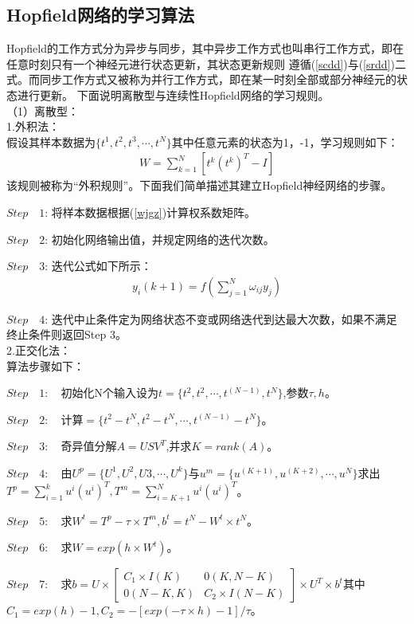 \subsection{Hopfield网络的学习算法}
Hopfield的工作方式分为异步与同步，其中异步工作方式也叫串行工作方式，即在任意时刻只有一个神经元进行状态更新，其状态更新规则
遵循(\ref{scdd})与(\ref{srdd})二式。而同步工作方式又被称为并行工作方式，即在某一时刻全部或部分神经元的状态进行更新。
下面说明离散型与连续性Hopfield网络的学习规则。\\
（1）离散型：\\
1.外积法：\\
假设其样本数据为$\{t^1,t^2,t^3,\cdots, t^N\}$其中任意元素的状态为1，-1，学习规则如下：
\begin{align}
    W = \sum_{k=1}^N [t^k(t^k)^T-I] \label{wjgz} %
\end{align}
该规则被称为“外积规则”。下面我们简单描述其建立Hopfield神经网络的步骤。\\
\par
$Step \quad 1$: 将样本数据根据(\ref{wjgz})计算权系数矩阵。
\par
$Step \quad 2$: 初始化网络输出值，并规定网络的迭代次数。
\par
$Step \quad 3$: 迭代公式如下所示：
\begin{align}
    y_i(k+1) = f(\sum_{j=1}^N \omega_{ij} y_j)
\end{align}
\par
$Step \quad 4$: 迭代中止条件定为网络状态不变或网络迭代到达最大次数，如果不满足终止条件则返回Step 3。\\
2.正交化法：\\
算法步骤如下：\\
\par
$Step \quad 1: \quad $初始化N个输入设为$t = \{t^2,t^2,\cdots, t^(N-1) ,t^N\}$,参数$\tau,h$。
\par
$Step \quad 2: \quad $计算$=\{t^2-t^N,t^2-t^N,\cdots,t^(N-1)-t^N\}$。
\par
$Step \quad 3: \quad $奇异值分解$A=USV^T$,并求$K = rank(A)$。
\par
$Step \quad 4: \quad $由$U^p = \{U^1,U^2,U3,\cdots,U^k\}$与$u^m = \{u^(K+1),u^(K+2),\cdots, u^N\}$求出$T^p = \sum_{i=1}^k u^i (u^i)^T, T^m = \sum_{i=K+1}^N u^i (u^i)^T$。
\par
$Step \quad 5: \quad $求$W^t = T^p-\tau \times T^m, b^t = t^N-W^t \times t^N$。
\par
$Step \quad 6: \quad $求$W = exp(h \times W^t)$。
\par
$Step \quad 7: \quad $求$b = U \times \left[\begin{array}{cc}
    C_{1} \times I(K) & 0(K, N-K) \\
    0(N-K, K) & C_{2} \times I(N-K)
    \end{array}\right] \times U^T \times b^t $其中$C_1 = exp(h) - 1, C_2 = -[exp(-\tau \times h) - 1]/\tau$。\\

